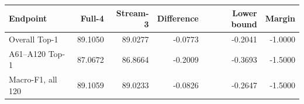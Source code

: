 \begin{tabular}{lrrrrr}
\toprule
Endpoint & Full-4 & Stream-3 & Difference & Lower bound & Margin \\
\midrule
Overall Top-1 & 89.1050 & 89.0277 & -0.0773 & -0.2041 & -1.0000 \\
A61--A120 Top-1 & 87.0672 & 86.8664 & -0.2009 & -0.3693 & -1.5000 \\
Macro-F1, all 120 & 89.1059 & 89.0233 & -0.0826 & -0.2647 & -1.5000 \\
\bottomrule
\end{tabular}
